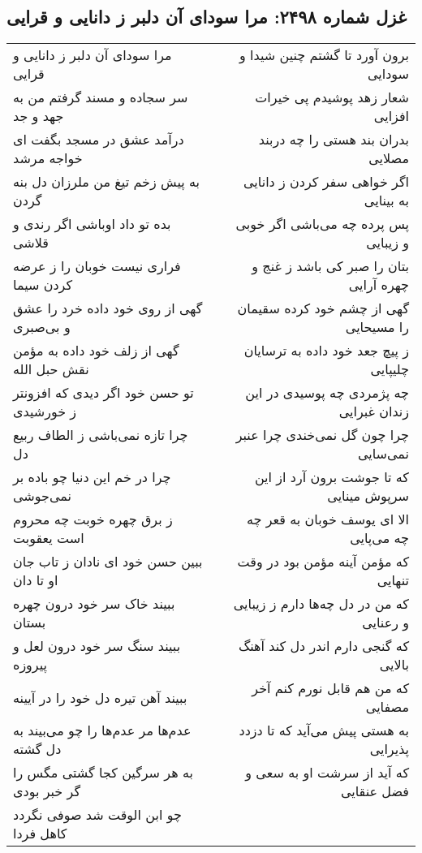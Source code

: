 \begin{center}
\section*{غزل شماره ۲۴۹۸: مرا سودای آن دلبر ز دانایی و قرایی}
\label{sec:2498}
\begin{longtable}{l p{0.5cm} r}
مرا سودای آن دلبر ز دانایی و قرایی
&&
برون آورد تا گشتم چنین شیدا و سودایی
\\
سر سجاده و مسند گرفتم من به جهد و جد
&&
شعار زهد پوشیدم پی خیرات افزایی
\\
درآمد عشق در مسجد بگفت ای خواجه مرشد
&&
بدران بند هستی را چه دربند مصلایی
\\
به پیش زخم تیغ من ملرزان دل بنه گردن
&&
اگر خواهی سفر کردن ز دانایی به بینایی
\\
بده تو داد اوباشی اگر رندی و قلاشی
&&
پس پرده چه می‌باشی اگر خوبی و زیبایی
\\
فراری نیست خوبان را ز عرضه کردن سیما
&&
بتان را صبر کی باشد ز غنج و چهره آرایی
\\
گهی از روی خود داده خرد را عشق و بی‌صبری
&&
گهی از چشم خود کرده سقیمان را مسیحایی
\\
گهی از زلف خود داده به مؤمن نقش حبل الله
&&
ز پیچ جعد خود داده به ترسایان چلیپایی
\\
تو حسن خود اگر دیدی که افزونتر ز خورشیدی
&&
چه پژمردی چه پوسیدی در این زندان غبرایی
\\
چرا تازه نمی‌باشی ز الطاف ربیع دل
&&
چرا چون گل نمی‌خندی چرا عنبر نمی‌سایی
\\
چرا در خم این دنیا چو باده بر نمی‌جوشی
&&
که تا جوشت برون آرد از این سرپوش مینایی
\\
ز برق چهره خوبت چه محروم است یعقوبت
&&
الا ای یوسف خوبان به قعر چه چه می‌پایی
\\
ببین حسن خود ای نادان ز تاب جان او تا دان
&&
که مؤمن آینه مؤمن بود در وقت تنهایی
\\
ببیند خاک سر خود درون چهره بستان
&&
که من در دل چه‌ها دارم ز زیبایی و رعنایی
\\
ببیند سنگ سر خود درون لعل و پیروزه
&&
که گنجی دارم اندر دل کند آهنگ بالایی
\\
ببیند آهن تیره دل خود را در آیینه
&&
که من هم قابل نورم کنم آخر مصفایی
\\
عدم‌ها مر عدم‌ها را چو می‌بیند به دل گشته
&&
به هستی پیش می‌آید که تا دزدد پذیرایی
\\
به هر سرگین کجا گشتی مگس را گر خبر بودی
&&
که آید از سرشت او به سعی و فضل عنقایی
\\
چو ابن الوقت شد صوفی نگردد کاهل فردا

\end{longtable}
\end{center}
